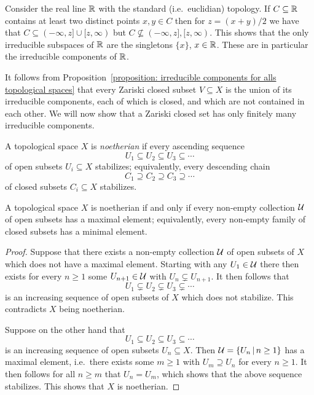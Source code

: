 \begin{example}
  Consider the real line $\mathbb{R}$ with the standard (i.e.\ euclidian) topology.
  If $C \subseteq \mathbb{R}$ contains at least two distinct points $x, y \in C$ then for $z =  (x+y)/2$ we have that $C \subseteq (-\infty,z] \cup [z,\infty)$ but $C \nsubseteq (-\infty,z], [z,\infty)$.
  This shows that the only irreducible subspaces of $\mathbb{R}$ are the singletons $\{x\}$, $x \in \mathbb{R}$.
  These are in particular the irreducible components of $\mathbb{R}$.
\end{example}




\begin{fluff}
  It follows from Proposition~\ref{proposition: irreducible components for alls topological spaces} that every Zariski closed subset $V \subseteq X$ is the union of its irreducible components, each of which is closed, and which are not contained in each other.
  We will now show that a Zariski closed set has only finitely many irreducible components.
\end{fluff}


\begin{definition}
  A topological space $X$ is \emph{noetherian} if every ascending sequence
  \[
              U_1
    \subseteq U_2
    \subseteq U_3
    \subseteq \dotsb
  \]
  of open subsets $U_i \subseteq X$ stabilizes;
  equivalently, every descending chain
  \[
              C_1
    \supseteq C_2
    \supseteq C_3
    \supseteq \dotsb
  \]
  of closed subsets $C_i \subseteq X$ stabilizes.
\end{definition}


\begin{lemma}
  \label{lemma: noetherian via max min elements of collections}
  A topological space $X$ is noetherian if and only if every non-empty collection $\mathcal{U}$ of open subsets has a maximal element;
  equivalently, every non-empty family of closed subsets has a minimal element.
\end{lemma}


\begin{proof}
  Suppose that there exists a non-empty collection $\mathcal{U}$ of open subsets of $X$ which does not have a maximal element.
  Starting with any $U_1 \in \mathcal{U}$ there then exists for every $n \geq 1$ some $U_{n+1} \in \mathcal{U}$ with $U_n \subsetneq U_{n+1}$.
  It then follows that
  \[
                U_1
    \subsetneq  U_2
    \subsetneq  U_3
    \subsetneq  \dotsb
  \]
  is an increasing sequence of open subsets of $X$ which does not stabilize.
  This contradicts $X$ being noetherian.
  
  Suppose on the other hand that
  \[
              U_1
    \subseteq U_2
    \subseteq U_3
    \subseteq \dotsb
  \]
  is an increasing sequence of open subsets $U_n \subseteq X$.
  Then $\mc{U} = \{U_n \suchthat n \geq 1\}$ has a maximal element, i.e.\ there exists some $m \geq 1$ with $U_m \supseteq U_n$ for every $n \geq 1$.
  It then follows for all $n \geq m$ that $U_n = U_m$, which shows that the above sequence stabilizes.
  This shows that $X$ is noetherian.
\end{proof}


